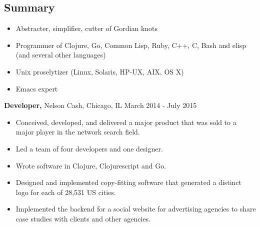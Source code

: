 \documentclass[margin]{res}
\begin{document}
 
 
 
\address{{\bf Home Address} \\ 2446 North Albany Avenue \\ Chicago, IL 60647-2602  \\
        (773) 349-2020 }
\address{{\bf Email Address} \\ me@clojure.us }

 
\begin{resume} 
 
\section{Summary} 
\begin{itemize} \itemsep -2pt %
\item Abstracter, simplifier, cutter of Gordian knots
\item Programmer of Clojure, Go, Common Lisp, Ruby, C++, C, Bash and elisp (and several other languages)
\item Unix proselytizer (Linux, Solaris, HP-UX, AIX, OS X)
\item Emacs expert
\end{itemize}

 {\bf Developer,} Nelson Cash, Chicago, IL \hfill March 2014 - July 2015
\begin{itemize} \itemsep -2pt %
\item Conceived, developed, and delivered a major product that was sold to a major player in the network search field.
\item Led a team of four developers and one designer.
\item Wrote software in Clojure, Clojurescript and Go.
\item Designed and implemented copy-fitting software that generated a distinct logo for each of 28,531 US cities.
\item Implemented the backend for a social website for advertising agencies to share case studies with clients and other agencies.
\end{itemize}


\end{resume}
\end{document}
